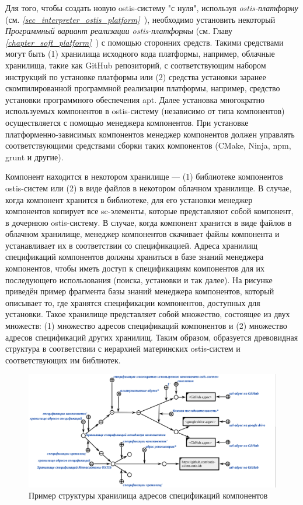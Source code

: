 Для того, чтобы создать новую ostis-систему "с нуля"{}, используя \textit{ostis-платформу} (см. \textit{\ref{sec_interpreter_ostis_platform}~}), необходимо установить некоторый \textit{Программный вариант реализации ostis-платформы} (см. Главу \textit{\ref{chapter_soft_platform}~}) с помощью сторонних средств. Такими средствами могут быть (1) хранилища исходного кода платформы, например, облачные хранилища, такие как GitHub репозиторий, с соответствующим набором инструкций по установке платформы или (2) средства установки заранее скомпилированной программной реализации платформы, например, средство установки программного обеспечения apt. Далее установка многократно используемых компонентов в ostis-систему (независимо от типа компонентов) осуществляется с помощью менеджера компонентов. При установке платформенно-зависимых компонентов менеджер компонентов должен управлять соответствующими средствами сборки таких компонентов (CMake, Ninja, npm, grunt и другие).

Компонент находится в некотором хранилище --- (1) библиотеке компонентов ostis-систем или (2) в виде файлов в некотором облачном хранилище. В случае, когда компонент хранится в библиотеке, для его установки менеджер компонентов копирует все sc-элементы, которые представляют собой компонент, в дочернюю ostis-систему. В случае, когда компонент хранится в виде файлов в облачном хранилище, менеджер компонентов скачивает файлы компонента и устанавливает их в соответствии со спецификацией. Адреса хранилищ спецификаций компонентов должны храниться в базе знаний менеджера компонентов, чтобы иметь доступ к спецификациям компонентов для их последующего использования (поиска, установки и так далее). На рисунке \textit{} приведён пример фрагмента базы знаний менеджера компонентов, который описывает то, где хранятся спецификации компонентов, доступных для установки. Такое хранилище представляет собой множество, состоящее из двух множеств: (1) множество адресов спецификаций компонентов и (2) множество адресов спецификаций других хранилищ. Таким образом, образуется древовидная структура в соответствии с иерархией материнских ostis-систем и соответствующих им библиотек.

\begin{figure}[H]
	\includegraphics[scale=0.5]{author/part5/figures/specification_storage_addresses.png}
	\caption{Пример структуры хранилища адресов спецификаций компонентов}
	\label{fig:specification_storage_addresses}
\end{figure}


